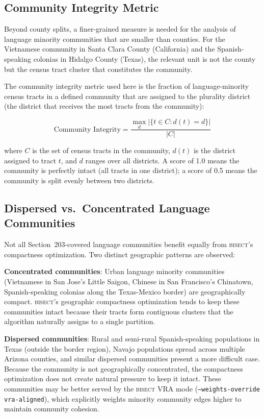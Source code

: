 \subsection{Community Integrity Metric}

Beyond county splits, a finer-grained measure is needed for the analysis
of language minority communities that are smaller than counties. For the
Vietnamese community in Santa Clara County (California) and the Spanish-speaking
colonias in Hidalgo County (Texas), the relevant unit is not the county
but the census tract cluster that constitutes the community.

The community integrity metric used here is the fraction of language-minority
census tracts in a defined community that are assigned to the plurality district
(the district that receives the most tracts from the community):

\[
\text{Community Integrity} = \frac{\max_d |\{t \in C : d(t) = d\}|}{|C|}
\]

where $C$ is the set of census tracts in the community, $d(t)$ is the
district assigned to tract $t$, and $d$ ranges over all districts. A score
of 1.0 means the community is perfectly intact (all tracts in one district);
a score of 0.5 means the community is split evenly between two districts.

\subsection{Dispersed vs.\ Concentrated Language Communities}

Not all Section~203-covered language communities benefit equally from
\textsc{bisect}'s compactness optimization. Two distinct geographic
patterns are observed:

\textbf{Concentrated communities}: Urban language minority communities
(Vietnamese in San Jose's Little Saigon, Chinese in San Francisco's
Chinatown, Spanish-speaking colonias along the Texas-Mexico border)
are geographically compact. \textsc{bisect}'s geographic compactness
optimization tends to keep these communities intact because their tracts
form contiguous clusters that the algorithm naturally assigns to a single
partition.

\textbf{Dispersed communities}: Rural and semi-rural Spanish-speaking
populations in Texas (outside the border region), Navajo populations
spread across multiple Arizona counties, and similar dispersed communities
present a more difficult case. Because the community is not geographically
concentrated, the compactness optimization does not create natural pressure
to keep it intact. These communities may be better served by the
\textsc{bisect} VRA mode (\texttt{--weights-override vra-aligned}), which
explicitly weights minority community edges higher to maintain community
cohesion.
